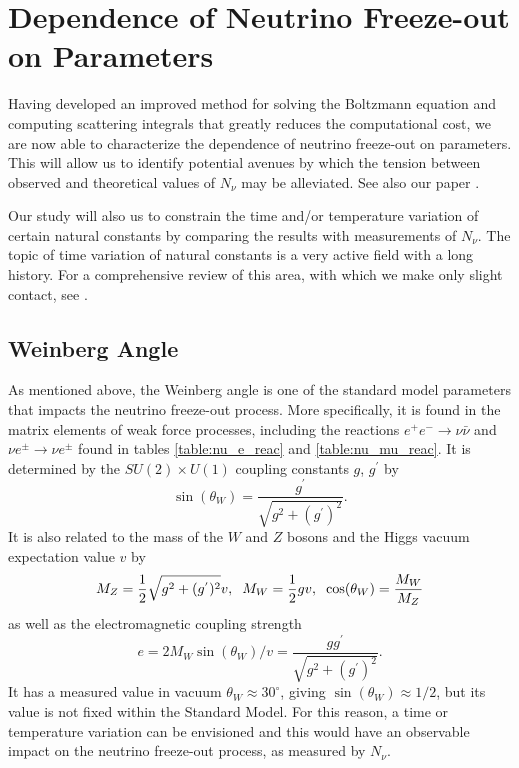 \chapter{Dependence of Neutrino Freeze-out on Parameters}\label{ch:param_studies}
Having developed an improved method for solving the Boltzmann equation and computing scattering integrals that greatly reduces the computational cost, we are now able to characterize the dependence of neutrino freeze-out on parameters.  This will allow us to identify potential avenues by which the tension between observed and theoretical values of $N_\nu$ may be alleviated.  See also our paper \cite{Birrell:2014uka}.

Our study will also us to constrain the time and/or temperature variation of certain natural constants by comparing the results with measurements of $N_\nu$.  The topic of time variation of natural constants is a very active field with a long history. For a comprehensive review of this area, with which we make only slight contact,  see \cite{Uzan:2010pm}.



\section{Weinberg Angle}

As mentioned above, the Weinberg angle is one of the standard model parameters that impacts the neutrino freeze-out process.  More specifically, it is found in the matrix elements of weak force processes, including the reactions $e^+e^-\rightarrow \nu\bar\nu$ and $\nu e^\pm\rightarrow \nu e^\pm$ found in tables \ref{table:nu_e_reac} and \ref{table:nu_mu_reac}.  It is determined by the $SU(2)\times U(1)$ coupling constants $g$, $g^{'}$  by
\begin{equation}
\sin(\theta_W)=\frac{g^{'}}{\sqrt{g^2+(g^{'})^2}}.
\end{equation}
It is also related to the mass of the $W$ and $Z$ bosons and the Higgs vacuum expectation value $v$ by
\begin{equation}
M_Z=\frac{1}{2}\sqrt{g^2+(g^{'})^2}v,\hspace{2mm}  M_W=\frac{1}{2}gv,\hspace{2mm} \cos(\theta_W)=\frac{M_W}{M_Z}
\end{equation}
as well as the electromagnetic coupling strength
\begin{equation}
e=2M_W\sin(\theta_W)/v=\frac{gg^{'}}{\sqrt{g^2+(g^{'})^2}}.
\end{equation}
It has a measured value in vacuum $\theta_W\approx 30^\circ$, giving $\sin(\theta_W)\approx 1/2$, but its value is not fixed within the Standard Model. For this reason, a time or temperature variation can be envisioned and this would have an observable impact on the neutrino freeze-out process, as measured by $N_\nu$.


